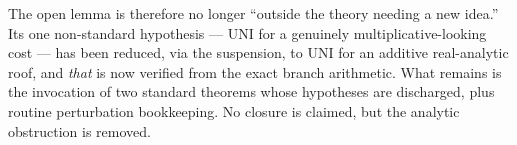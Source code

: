 \documentclass[11pt]{article}
\theoremstyle{remark}\newtheorem{remark}{Remark}
\begin{document}
The open lemma is therefore no longer ``outside the theory needing a new
idea.'' Its one non-standard hypothesis --- UNI for a genuinely
multiplicative-looking cost --- has been reduced, via the suspension, to UNI
for an additive real-analytic roof, and \emph{that} is now verified from the
exact branch arithmetic. What remains is the invocation of two standard
theorems whose hypotheses are discharged, plus routine perturbation
bookkeeping. No closure is claimed, but the analytic obstruction is removed.
\end{document}
